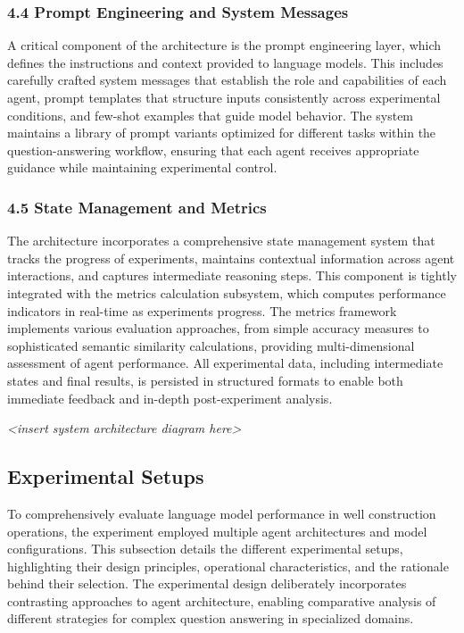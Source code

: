             \subsubsection{4.4 Prompt Engineering and System Messages}

            A critical component of the architecture is the prompt engineering layer, which defines the instructions and context provided to language models. This includes carefully crafted system messages that establish the role and capabilities of each agent, prompt templates that structure inputs consistently across experimental conditions, and few-shot examples that guide model behavior. The system maintains a library of prompt variants optimized for different tasks within the question-answering workflow, ensuring that each agent receives appropriate guidance while maintaining experimental control.

            \subsubsection{4.5 State Management and Metrics}

            The architecture incorporates a comprehensive state management system that tracks the progress of experiments, maintains contextual information across agent interactions, and captures intermediate reasoning steps. This component is tightly integrated with the metrics calculation subsystem, which computes performance indicators in real-time as experiments progress. The metrics framework implements various evaluation approaches, from simple accuracy measures to sophisticated semantic similarity calculations, providing multi-dimensional assessment of agent performance. All experimental data, including intermediate states and final results, is persisted in structured formats to enable both immediate feedback and in-depth post-experiment analysis.

            \textit{<insert system architecture diagram here>}

        \subsection{Experimental Setups}

            To comprehensively evaluate language model performance in well construction operations, the experiment employed multiple agent architectures and model configurations. This subsection details the different experimental setups, highlighting their design principles, operational characteristics, and the rationale behind their selection. The experimental design deliberately incorporates contrasting approaches to agent architecture, enabling comparative analysis of different strategies for complex question answering in specialized domains.
            

